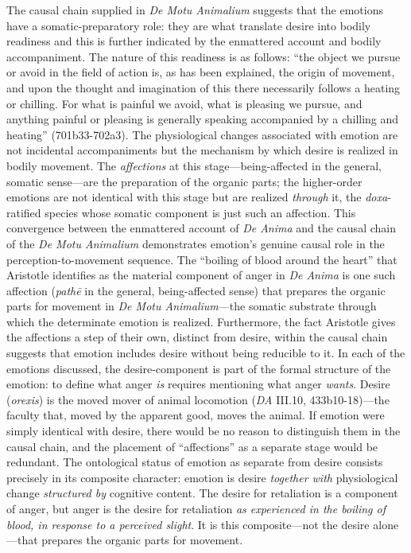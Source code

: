 \documentclass{article}
\begin{document}
The causal chain supplied in \textit{De Motu Animalium} suggests that the emotions have a somatic-preparatory role: they are what translate desire into bodily readiness and this is further indicated by the enmattered account and bodily accompaniment. The nature of this readiness is as follows: ``the object we pursue or avoid in the field of action is, as has been explained, the origin of movement, and upon the thought and imagination of this there necessarily follows a heating or chilling. For what is painful we avoid, what is pleasing we pursue, and anything painful or pleasing is generally speaking accompanied by a chilling and heating'' (701b33-702a3). The physiological changes associated with emotion are not incidental accompaniments but the mechanism by which desire is realized in bodily movement. The \textit{affections} at this stage---being-affected in the general, somatic sense---are the preparation of the organic parts; the higher-order emotions are not identical with this stage but are realized \textit{through} it, the \textit{doxa}-ratified species whose somatic component is just such an affection. This convergence between the enmattered account of \textit{De Anima} and the causal chain of the \textit{De Motu Animalium} demonstrates emotion's genuine causal role in the perception-to-movement sequence. The ``boiling of blood around the heart'' that Aristotle identifies as the material component of anger in \textit{De Anima} is one such affection (\textit{pathē} in the general, being-affected sense) that prepares the organic parts for movement in \textit{De Motu Animalium}---the somatic substrate through which the determinate emotion is realized. Furthermore, the fact Aristotle gives the affections a step of their own, distinct from desire, within the causal chain suggests that emotion includes desire without being reducible to it. In each of the emotions discussed, the desire-component is part of the formal structure of the emotion: to define what anger \textit{is} requires mentioning what anger \textit{wants}. Desire (\textit{orexis}) is the moved mover of animal locomotion (\textit{DA} III.10, 433b10-18)---the faculty that, moved by the apparent good, moves the animal. If emotion were simply identical with desire, there would be no reason to distinguish them in the causal chain, and the placement of ``affections'' as a separate stage would be redundant. The ontological status of emotion as separate from desire consists precisely in its composite character: emotion is desire \textit{together with} physiological change \textit{structured by} cognitive content. The desire for retaliation is a component of anger, but anger is the desire for retaliation \textit{as experienced in the boiling of blood, in response to a perceived slight}. It is this composite---not the desire alone---that prepares the organic parts for movement. 
\end{document}
